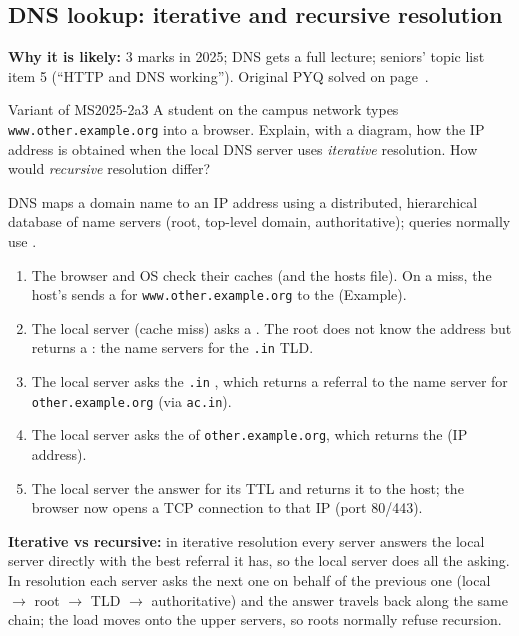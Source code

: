 \subsection{DNS lookup: iterative and recursive resolution}\label{iq:C18}
    

\textbf{Why it is likely:} 3 marks in 2025; DNS gets a full lecture; seniors' topic list item 5 (``HTTP and DNS working''). Original PYQ solved on page~\pageref{q:MS2025-2a}.

\begin{question}{Variant of MS2025-2a}{3}
A student on the campus network types \texttt{www.other.example.org} into a browser. Explain, with a diagram, how the IP address is obtained when the local DNS server uses \emph{iterative} resolution. How would \emph{recursive} resolution differ?
\end{question}
\begin{solution}
DNS maps a domain name to an IP address using a distributed, hierarchical database of name servers (root, top-level domain, authoritative); queries normally use .
\begin{enumerate}[label=\textbf{\arabic*.}]
\item The browser and OS check their caches (and the hosts file). On a miss, the host's  sends a  for \texttt{www.other.example.org} to the  (Example).
\item The local server (cache miss) asks a . The root does not know the address but returns a : the name servers for the \texttt{.in} TLD.
\item The local server asks the \texttt{.in} , which returns a referral to the name server for \texttt{other.example.org} (via \texttt{ac.in}).
\item The local server asks the  of \texttt{other.example.org}, which returns the  (IP address).
\item The local server  the answer for its TTL and returns it to the host; the browser now opens a TCP connection to that IP (port 80/443).
\end{enumerate}
\textbf{Iterative vs recursive:} in iterative resolution every server answers the local server directly with the best referral it has, so the local server does all the asking. In  resolution each server asks the next one on behalf of the previous one (local $\to$ root $\to$ TLD $\to$ authoritative) and the answer travels back along the same chain; the load moves onto the upper servers, so roots normally refuse recursion.
\end{solution}

